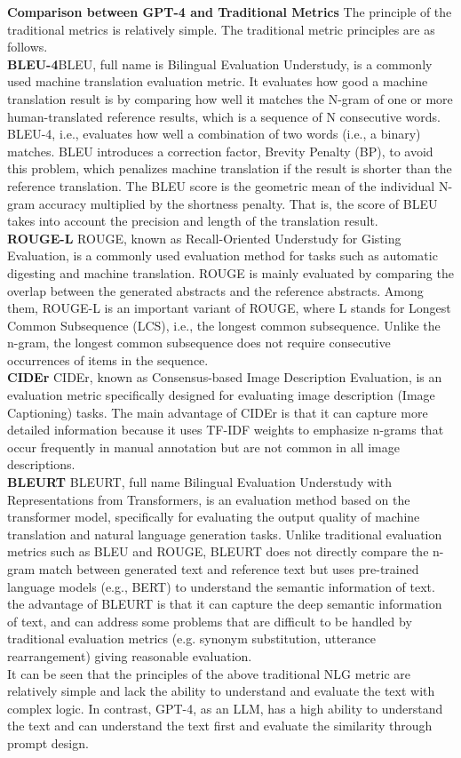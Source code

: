 \noindent\textbf{Comparison between GPT-4 and Traditional Metrics}\quad
The principle of the traditional metrics is relatively simple. The traditional metric principles are as follows.\\
\noindent\textbf{BLEU-4}\quad BLEU, full name is Bilingual Evaluation Understudy, is a commonly used machine translation evaluation metric. It evaluates how good a machine translation result is by comparing how well it matches the N-gram of one or more human-translated reference results, which is a sequence of N consecutive words. BLEU-4, i.e., evaluates how well a combination of two words (i.e., a binary) matches. BLEU introduces a correction factor, Brevity Penalty (BP), to avoid this problem, which penalizes machine translation if the result is shorter than the reference translation. The BLEU score is the geometric mean of the individual N-gram accuracy multiplied by the shortness penalty. That is, the score of BLEU takes into account the precision and length of the translation result.\\
\noindent\textbf{ROUGE-L}\quad
ROUGE, known as Recall-Oriented Understudy for Gisting Evaluation, is a commonly used evaluation method for tasks such as automatic digesting and machine translation. ROUGE is mainly evaluated by comparing the overlap between the generated abstracts and the reference abstracts. Among them, ROUGE-L is an important variant of ROUGE, where L stands for Longest Common Subsequence (LCS), i.e., the longest common subsequence. Unlike the n-gram, the longest common subsequence does not require consecutive occurrences of items in the sequence.
\\
\noindent\textbf{CIDEr}\quad
CIDEr, known as Consensus-based Image Description Evaluation, is an evaluation metric specifically designed for evaluating image description (Image Captioning) tasks. The main advantage of CIDEr is that it can capture more detailed information because it uses TF-IDF weights to emphasize n-grams that occur frequently in manual annotation but are not common in all image descriptions.\\
\noindent\textbf{BLEURT}\quad
BLEURT, full name Bilingual Evaluation Understudy with Representations from Transformers, is an evaluation method based on the transformer model, specifically for evaluating the output quality of machine translation and natural language generation tasks. Unlike traditional evaluation metrics such as BLEU and ROUGE, BLEURT does not directly compare the n-gram match between generated text and reference text but uses pre-trained language models (e.g., BERT) to understand the semantic information of text. the advantage of BLEURT is that it can capture the deep semantic information of text, and can address some problems that are difficult to be handled by traditional evaluation metrics (e.g. synonym substitution, utterance rearrangement) giving reasonable evaluation.\\
It can be seen that the principles of the above traditional NLG metric are relatively simple and lack the ability to understand and evaluate the text with complex logic. In contrast, GPT-4, as an LLM, has a high ability to understand the text and can understand the text first and evaluate the similarity through prompt design.

